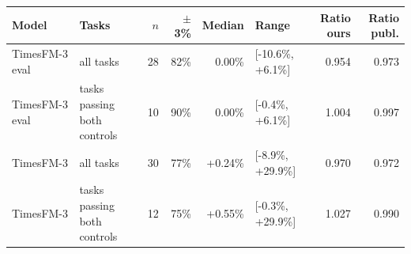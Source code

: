 \begin{tabular}{llrrrlrr}
\toprule
Model & Tasks & $n$ & $\pm$3\% & Median & Range & Ratio ours & Ratio publ. \\
\midrule
TimesFM-3 eval & all tasks & 28 & 82\% & 0.00\% & [-10.6\%, +6.1\%] & 0.954 & 0.973 \\
TimesFM-3 eval & tasks passing both controls & 10 & 90\% & 0.00\% & [-0.4\%, +6.1\%] & 1.004 & 0.997 \\
TimesFM-3 & all tasks & 30 & 77\% & +0.24\% & [-8.9\%, +29.9\%] & 0.970 & 0.972 \\
TimesFM-3 & tasks passing both controls & 12 & 75\% & +0.55\% & [-0.3\%, +29.9\%] & 1.027 & 0.990 \\
\bottomrule
\end{tabular}
